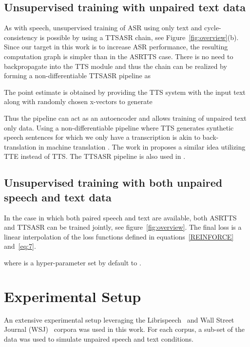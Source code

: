 \documentclass[a4paper]{article}
\begin{document}
\subsection{Unsupervised training with unpaired text data}

As with speech, unsupervised training of ASR using only text and cycle-consistency is possible by using a TTSASR chain, see Figure~\ref{fig:overview}(b). Since our target in this work is to increase ASR performance, the resulting computation graph is simpler than in the ASRTTS case. There is no need to backpropagate into the TTS module and thus the chain can be realized by forming a non-differentiable TTSASR pipeline as

The point estimate is obtained by providing the TTS system with the input text  along with randomly chosen x-vectors to generate

Thus the pipeline can act as an autoencoder and allows training of unpaired text only data. Using a non-differentiable pipeline where TTS generates synthetic speech sentences for which we only have a transcription is akin to back-translation in machine translation \cite{sennrich2015improving}. The work in \cite{hayashi2018back} proposes a similar idea utilizing TTE instead of TTS. The TTSASR pipeline is also used in \cite{tjandra2017listening}.

\subsection{Unsupervised training with both unpaired speech and text data}
In the case in which both paired speech and text are available, both ASRTTS and TTSASR can be trained jointly, see figure~\ref{fig:overview}. The final loss  is a linear interpolation of the loss functions defined in equations~\eqref{REINFORCE} and~\eqref{eq:7}. 



\noindent where  is a hyper-parameter set by default to .
\section{Experimental Setup}\label{sec:3}
An extensive experimental setup leveraging the Librispeech~\cite{panayotov2015librispeech} and Wall Street Journal (WSJ)~\cite{paul1992design} corpora was used in this work. For each corpus, a sub-set of the data was used to simulate unpaired speech and text conditions.
\end{document}

